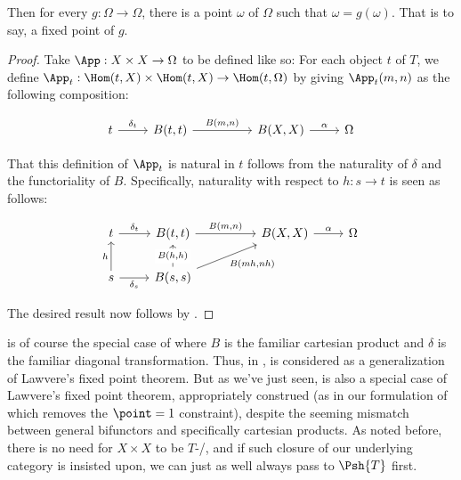 Then for every $g : \Omega \to \Omega$, there is a point $\omega$ of $\Omega$ such that $\omega = g(\omega)$. That is to say, a fixed point of $g$.
\begin{proof}
Take $\App : X \times X \to \Omega$ to be defined like so: For each object $t$ of $T$, we define $\App_t : \Hom(t, X) \times \Hom(t, X) \to \Hom(t, \Omega)$ by giving $\App_t(m, n)$ as the following composition:

\[\begin{tikzcd}
	t & {B(t, t)} && {B(X, X)} & \Omega
	\arrow["{\delta_{t}}", from=1-1, to=1-2]
	\arrow["{B(m, n)}", from=1-2, to=1-4]
	\arrow["\alpha", from=1-4, to=1-5]
\end{tikzcd}\]

That this definition of $\App_t$ is natural in $t$ follows from the naturality of $\delta$ and the functoriality of $B$. Specifically, naturality with respect to $h: s \to t$ is seen as follows:

\[\begin{tikzcd}
	t & {B(t, t)} && {B(X, X)} & \Omega \\
	s & {B(s, s)}
	\arrow["{\delta_{t}}", from=1-1, to=1-2]
	\arrow["{B(m, n)}", from=1-2, to=1-4]
	\arrow["\alpha", from=1-4, to=1-5]
	\arrow["{\delta_s}"', from=2-1, to=2-2]
	\arrow["h", from=2-1, to=1-1]
	\arrow["{B(h, h)}"{description}, from=2-2, to=1-2]
	\arrow["{B(m h, n h)}"', from=2-2, to=1-4]
\end{tikzcd}\]

The desired result now follows by .
\end{proof}
 is of course the special case of  where $B$ is the familiar cartesian product and $\delta$ is the familiar diagonal transformation. Thus, in \autocite{roberts2021substructural},  is considered as a generalization of Lawvere's fixed point theorem. But as we've just seen,  is also a special case of Lawvere's fixed point theorem, appropriately construed (as in our formulation of  which removes the $\point = 1$ constraint), despite the seeming mismatch between general bifunctors and specifically cartesian products. As noted before, there is no need for $X \times X$ to be $T$-\repsmall/, and if such closure of our underlying category is insisted upon, we can just as well always pass to $\Psh{T}$ first.

\fileend